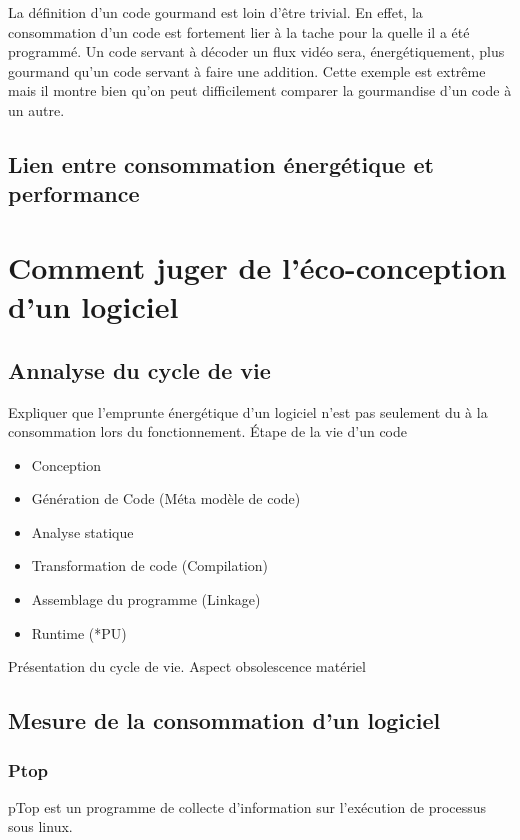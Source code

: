 \documentclass[a4paper, 11pt]{report}
\begin{document}
La définition d’un code gourmand est loin d’être trivial. En effet, la consommation d’un code est fortement lier à la tache pour la quelle il a été programmé. Un code servant à décoder un flux vidéo sera, énergétiquement, plus gourmand qu’un code servant à faire une addition. Cette exemple est extrême mais il montre bien qu’on peut difficilement comparer la gourmandise d’un code à un autre.

\subsection{Lien entre consommation énergétique et performance}

\section{Comment juger de l'éco-conception d'un logiciel}
\subsection{Annalyse du cycle de vie}
Expliquer que l’emprunte énergétique d’un logiciel n’est pas seulement du à la consommation lors du fonctionnement.
Étape de la vie d’un code
\begin{itemize}
	\item Conception
	\item Génération de Code (Méta modèle de code)
	\item Analyse statique
	\item Transformation de code (Compilation)
	\item Assemblage du programme (Linkage)
	\item Runtime (*PU)
\end{itemize}
Présentation du cycle de vie.
Aspect obsolescence matériel

\subsection{Mesure de la consommation d'un logiciel}
\subsubsection{Ptop}
pTop est un programme de collecte d’information sur l'exécution de processus sous linux.
\end{document}
